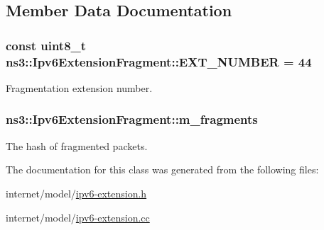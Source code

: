\subsection{Member Data Documentation}
\subsubsection[{\texorpdfstring{E\+X\+T\+\_\+\+N\+U\+M\+B\+ER}{EXT_NUMBER}}]{\setlength{\rightskip}{0pt plus 5cm}const uint8\+\_\+t ns3\+::\+Ipv6\+Extension\+Fragment\+::\+E\+X\+T\+\_\+\+N\+U\+M\+B\+ER = 44\hspace{0.3cm}{\ttfamily [static]}}\hypertarget{classns3_1_1Ipv6ExtensionFragment_ae87f2248d10cdb25e8e082fa74049425}{}\label{classns3_1_1Ipv6ExtensionFragment_ae87f2248d10cdb25e8e082fa74049425}


Fragmentation extension number. 

\subsubsection[{\texorpdfstring{m\+\_\+fragments}{m_fragments}}]{ ns3\+::\+Ipv6\+Extension\+Fragment\+::m\+\_\+fragments\hspace{0.3cm}{\ttfamily [private]}}\hypertarget{classns3_1_1Ipv6ExtensionFragment_aa830df260b53ecc85fd602a558232f7f}{}\label{classns3_1_1Ipv6ExtensionFragment_aa830df260b53ecc85fd602a558232f7f}


The hash of fragmented packets. 



The documentation for this class was generated from the following files\+:\begin{DoxyCompactItemize}
\item 
internet/model/\hyperlink{ipv6-extension_8h}{ipv6-\/extension.\+h}\item 
internet/model/\hyperlink{ipv6-extension_8cc}{ipv6-\/extension.\+cc}\end{DoxyCompactItemize}
